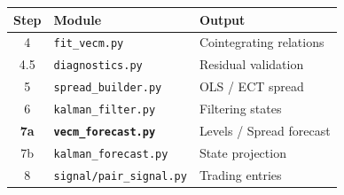 \documentclass[10pt,a4paper,twocolumn]{article}
\begin{document}
\begin{center}{\small
\begin{tabular}{@{}clp{2.5cm}@{}}
\toprule Step & Module & Output\\\midrule
4 & \texttt{fit\_vecm.py} & Cointegrating relations\\
4.5 & \texttt{diagnostics.py} & Residual validation\\
5 & \texttt{spread\_builder.py} & OLS / ECT spread\\
6 & \texttt{kalman\_filter.py} & Filtering states\\
\textbf{7a} & \textbf{\texttt{vecm\_forecast.py}} & Levels / Spread forecast\\
7b & \texttt{kalman\_forecast.py} & State projection\\
8 & \texttt{signal/pair\_signal.py} & Trading entries\\
\bottomrule
\end{tabular}
}\end{center}
\end{document}
